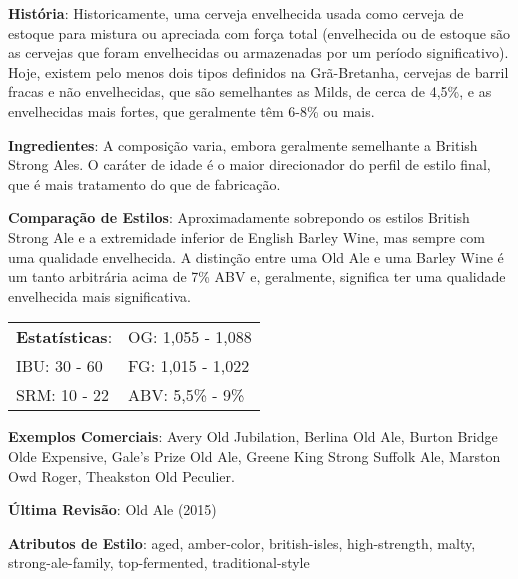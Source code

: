 \textbf{História}: Historicamente, uma cerveja envelhecida usada como cerveja de estoque para mistura ou apreciada com força total (envelhecida ou de estoque são as cervejas que foram envelhecidas ou armazenadas por um período significativo). Hoje, existem pelo menos dois tipos definidos na Grã-Bretanha, cervejas de barril fracas e não envelhecidas, que são semelhantes as Milds, de cerca de 4,5\%, e as envelhecidas mais fortes, que geralmente têm 6-8\% ou mais.

\textbf{Ingredientes}: A composição varia, embora geralmente semelhante a British Strong Ales. O caráter de idade é o maior direcionador do perfil de estilo final, que é mais tratamento do que de fabricação.

\textbf{Comparação de Estilos}: Aproximadamente sobrepondo os estilos British Strong Ale e a extremidade inferior de English Barley Wine, mas sempre com uma qualidade envelhecida. A distinção entre uma Old Ale e uma Barley Wine é um tanto arbitrária acima de 7\% ABV e, geralmente, significa ter uma qualidade envelhecida mais significativa.

\begin{tabular}{@{}p{35mm}p{35mm}@{}}
  \textbf{Estatísticas}: & OG: 1,055 - 1,088 \\
  IBU: 30 - 60  & FG: 1,015 - 1,022  \\
  SRM: 10 - 22  & ABV: 5,5\% - 9\%
\end{tabular}

\textbf{Exemplos Comerciais}: Avery Old Jubilation, Berlina Old Ale, Burton Bridge Olde Expensive, Gale’s Prize Old Ale, Greene King Strong Suffolk Ale, Marston Owd Roger, Theakston Old Peculier.

\textbf{Última Revisão}: Old Ale (2015)

\textbf{Atributos de Estilo}: aged, amber-color, british-isles, high-strength, malty, strong-ale-family, top-fermented, traditional-style